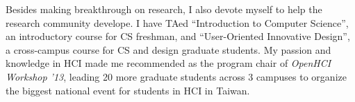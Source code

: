 \noindent
Besides making breakthrough on research, I also devote myself to help the research community develope.
I have TAed ``Introduction to Computer Science'', an introductory course for CS freshman, 
and ``User-Oriented Innovative Design'', a cross-campus course for CS and design graduate students.
My passion and knowledge in HCI made me recommended as the program chair of \textit{OpenHCI Workshop '13},
leading 20 more graduate students across 3 campuses to organize the biggest national event for students in HCI in Taiwan. \\



